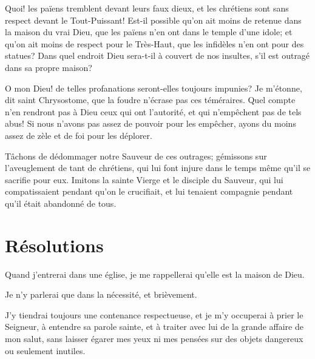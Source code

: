 \documentclass[instructions.tex]{subfiles}
\begin{document}
\secundo Quoi! les païens tremblent devant leurs faux dieux, et les chrétiens sont sans respect devant le Tout-Puissant! Est-il possible qu’on ait moins de retenue dans la maison du vrai Dieu, que les païens n’en ont dans le temple d’une idole; et qu’on ait moins de respect pour le Très-Haut, que les infidèles n’en ont pour des statues? Dans quel endroit Dieu sera-t-il à couvert de nos insultes, s’il est outragé dans sa propre maison?
 
O mon Dieu! de telles profanations seront-elles toujours impunies? Je m’étonne, dit saint Chrysostome, que la foudre n’écrase pas ces téméraires. Quel compte n’en rendront pas à Dieu ceux qui ont l’autorité, et qui n’empêchent pas de tels abus! Si nous n’avons pas assez de pouvoir pour les empêcher, ayons du moins assez de zèle et de foi pour les déplorer.
 
Tâchons de dédommager notre Sauveur de ces outrages; gémissons sur l’aveuglement de tant de chrétiens, qui lui font injure dans le temps même qu’il se sacrifie pour eux. Imitons la sainte Vierge et le disciple du Sauveur, qui lui compatissaient pendant qu’on le crucifiait, et lui tenaient compagnie pendant qu’il était abandonné de tous.
 
\section{Résolutions}
 
\primo Quand j’entrerai dans une église, je me rappellerai qu’elle est la maison de Dieu.
 
\secundo Je n’y parlerai que dans la nécessité, et brièvement.
 
\tertio J’y tiendrai toujours une contenance respectueuse, et je m’y occuperai à prier le Seigneur, à entendre sa parole sainte, et à traiter avec lui de la grande affaire de mon salut, sans laisser égarer mes yeux ni mes pensées sur des objets dangereux ou seulement inutiles. 
 
\end{document}
